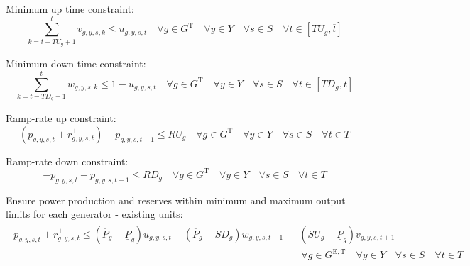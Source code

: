 \documentclass{article}
\newcommand{\sGeneratorsExistingThermal}{G^{\mathrm{E,T}}}
\newcommand{\sGeneratorsThermal}{G^{\mathrm{T}}}
\newcommand{\sYears}{Y}
\newcommand{\sScenarios}{S}
\newcommand{\sIntervals}{T}
\newcommand{\iGenerator}{g}
\newcommand{\iYear}{y}
\newcommand{\iScenario}{s}
\newcommand{\iInterval}{t}
\newcommand{\iIntervalAlias}{k}
\newcommand{\iIntervalTerminal}{\overline{\iInterval}}
\newcommand{\cPowerOutputMax}[1][\iGenerator,\iYear]{\overline{P}_{#1}}
\newcommand{\cUpTimeMin}[1][\iGenerator]{TU_{#1}}
\newcommand{\cDownTimeMin}[1][\iGenerator]{TD_{#1}}
\newcommand{\cRampRateUp}[1][\iGenerator]{RU_{#1}}
\newcommand{\cRampRateDown}[1][\iGenerator]{RD_{#1}}
\newcommand{\cPowerOutputMin}[1][\iGenerator]{\underline{P}_{#1}}
\newcommand{\cRampRateStartup}[1][\iGenerator]{SU_{#1}}
\newcommand{\cRampRateShutdown}[1][\iGenerator]{SD_{#1}}
\newcommand{\vStartupIndicator}[1][\iGenerator,\iYear,\iScenario,\iInterval]{v_{#1}}
\newcommand{\vShutdownIndicator}[1][\iGenerator,\iYear,\iScenario,\iInterval]{w_{#1}}
\newcommand{\vReserveUp}[1][\iGenerator,\iYear,\iScenario,\iInterval]{r^{+}_{#1}}
\newcommand{\vOnIndicator}[1][\iGenerator,\iYear,\iScenario,\iInterval]{u_{#1}}
\newcommand{\vPower}[1][\iGenerator,\iYear,\iScenario,\iInterval]{p_{#1}}
\begin{document}
Minimum up time constraint:
\begin{equation}
\sum\limits_{\iIntervalAlias=\iInterval-\cUpTimeMin + 1}^{\iInterval} \vStartupIndicator[\iGenerator,\iYear,\iScenario,\iIntervalAlias] \leq \vOnIndicator \quad \forall \iGenerator \in \sGeneratorsThermal \quad \forall \iYear \in \sYears \quad \forall \iScenario \in \sScenarios \quad \forall \iInterval \in \left[\cUpTimeMin, \iIntervalTerminal \right]
\end{equation}

Minimum down-time constraint:
\begin{equation}
\sum\limits_{\iIntervalAlias=\iInterval-\cDownTimeMin[\iGenerator]+1}^{\iInterval}\vShutdownIndicator[\iGenerator,\iYear,\iScenario,\iIntervalAlias] \leq 1 - \vOnIndicator \quad \forall \iGenerator \in \sGeneratorsThermal \quad \forall \iYear \in \sYears \quad \forall \iScenario \in \sScenarios \quad \forall \iInterval \in \left[\cDownTimeMin, \iIntervalTerminal \right]
\end{equation}

Ramp-rate up constraint:
\begin{equation}
\left(\vPower + \vReserveUp\right) - \vPower[\iGenerator,\iYear,\iScenario,\iInterval-1] \leq \cRampRateUp \quad \forall \iGenerator \in \sGeneratorsThermal \quad \forall \iYear \in \sYears \quad \forall \iScenario \in \sScenarios \quad \forall \iInterval \in \sIntervals
\end{equation}

Ramp-rate down constraint:
\begin{equation}
- \vPower + \vPower[\iGenerator,\iYear,\iScenario,\iInterval-1] \leq \cRampRateDown \quad \forall \iGenerator \in \sGeneratorsThermal \quad \forall \iYear \in \sYears \quad \forall \iScenario \in \sScenarios \quad \forall \iInterval \in \sIntervals
\end{equation}

Ensure power production and reserves within minimum and maximum output limits for each generator - existing units:
\begin{align}
	\begin{split}
	\vPower + \vReserveUp \leq \left(\cPowerOutputMax[\iGenerator] - \cPowerOutputMin\right) \vOnIndicator - \left(\cPowerOutputMax[\iGenerator] -\cRampRateShutdown \right) \vShutdownIndicator[\iGenerator,\iYear,\iScenario,\iInterval+1] & + \left(\cRampRateStartup - \cPowerOutputMin\right)\vStartupIndicator[\iGenerator,\iYear,\iScenario,\iInterval+1]\\
	& \quad \forall \iGenerator \in \sGeneratorsExistingThermal \quad \forall \iYear \in \sYears \quad \forall \iScenario \in \sScenarios \quad \forall \iInterval \in \sIntervals\\
	\end{split}
\end{align}
\end{document}
